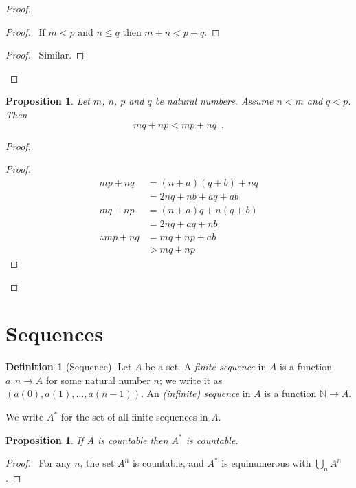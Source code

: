 \documentclass{book}
\let\qed\relax
\newtheorem{prop}[ax]{Proposition}
\theoremstyle{definition}
\newtheorem{df}[ax]{Definition}
\begin{document}
\begin{proof}
\pf
{}
\begin{proof}
	\pf\ If $m < p$ and $n \leq q$ then $m+n < p + q$.
\end{proof}
\begin{proof}
	\pf\ Similar.
\end{proof}
\qed
\end{proof}

\begin{prop}
\label{prop:intmultlemma}
Let $m$, $n$, $p$ and $q$ be natural numbers. Assume $n < m$ and $q < p$. Then
\[ mq + np < mp + nq \enspace . \]
\end{prop}

\begin{proof}
\pf
{}
\begin{proof}
	\pf
	\begin{align*}
		mp + nq & = (n+a) (q + b) + nq \\
		& = 2nq + nb + aq + ab \\
		mq + np & = (n + a) q + n (q + b) \\
		& = 2nq + aq + nb \\
		\therefore mp + nq & = mq + np + ab \\
		& > mq + np
	\end{align*}
\end{proof}
\qed
\end{proof}

\section{Sequences}

\begin{df}[Sequence]
Let $A$ be a set. A \emph{finite sequence} in $A$ is a function $a : n \rightarrow A$ for some natural number $n$; we write it as $(a(0), a(1), \ldots, a(n-1))$. An \emph{(infinite) sequence} in $A$ is a function $\mathbb{N} \rightarrow A$.

We write $A^*$ for the set of all finite sequences in $A$.
\end{df}

\begin{prop}
If $A$ is countable then $A^*$ is countable.
\end{prop}

\begin{proof}
\pf\ For any $n$, the set $A^n$ is countable, and $A^*$ is equinumerous with $\bigcup_n A^n$. \qed
\end{proof}
\end{document}
